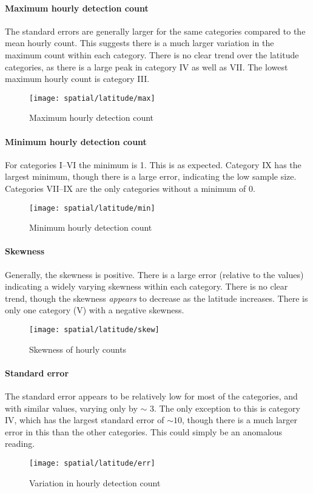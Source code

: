 \paragraph{Maximum hourly detection count\\}
The standard errors are generally larger for the same categories compared to the mean hourly count. This suggests there is a much larger variation in the maximum count within each category. There is no clear trend over the latitude categories, as there is a large peak in category IV as well as VII. The lowest maximum hourly count is category III.
\begin{figure}[h!]
	\centering
	\texttt{[image: spatial/latitude/max]}
	\caption{Maximum hourly detection count
		\label{fig:spat:lat:max}}
\end{figure}

\paragraph{Minimum hourly detection count\\}
For categories I--VI the minimum is 1. This is as expected. Category IX has the largest minimum, though there is a large error, indicating the low sample size. Categories VII--IX are the only categories without a minimum of 0. 
\begin{figure}[h!]
	\centering
	\texttt{[image: spatial/latitude/min]}
	\caption{Minimum hourly detection count
		\label{fig:spat:lat:min}}
\end{figure}
\paragraph{Skewness\\}
Generally, the skewness is positive. There is a large error (relative to the values) indicating a widely varying skewness within each category. There is no clear trend, though the skewness {\it appears} to decrease as the latitude increases. There is only one category (V) with a negative skewness.
\begin{figure}[h!]
	\centering
	\texttt{[image: spatial/latitude/skew]}
	\caption{Skewness of hourly counts
		\label{fig:spat:lat:skew}}
\end{figure}
\paragraph{Standard error\\}
The standard error appears to be relatively low for most of the categories, and with similar values, varying only by ${\sim}$ 3. The only exception to this is category IV, which has the largest standard error of ${\sim} 10$, though there is a much larger error in this than the other categories. This could simply be an anomalous reading.
\begin{figure}[h!]
	\centering
	\texttt{[image: spatial/latitude/err]}
	\caption{Variation in hourly detection count 
		\label{fig:spat:lat:err}}
\end{figure}
